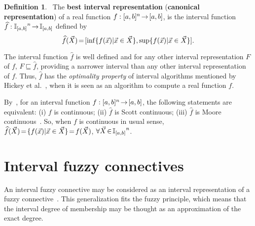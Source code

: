 \documentclass[12pt]{article}
\theoremstyle{plain}
\theoremstyle{remark}
\theoremstyle{definition}
\newtheorem{definition}[theorem]{Definition}
\theoremstyle{proposition}
\newcommand{\lra}{\hspace{-0.05cm}\rightarrow\hspace{-0.05cm}}
\begin{document}
\begin{definition}~\cite[Section 2]{SBA06}\label{d2}  The {\bf best interval representation} ({\bf canonical representation}) of a real function $f:[a,b]^n\lra [a,b]$, is the interval function
$\widehat{f}:{\mathbb{I}_{[a,b]}}^n\lra \mathbb{I}_{[a,b]}$ defined by\vspace{-0.2cm}
\begin{equation}\label{eq-br}\vspace{-0.1cm}
\widehat{f}(\vec{X})\hspace{-0.05cm}=\hspace{-0.05cm}[\inf \{f(\vec{x})|\vec{x} \in \vec{X}\}, \sup \{f(\vec{x})|\vec{x} \in \vec{X}\}].
\end{equation}
\end{definition}

The interval function $\widehat{f}$ is well defined and for any other interval representation $F$ of $f$, $F\sqsubseteq
\widehat{f}$, providing a narrower interval than any other interval representation of
$f$. Thus, $\widehat{f}$ has the \emph{optimality property} of interval algorithms mentioned by Hickey et
al.~\cite{Hic01}, when it is seen as an algorithm to compute a real function $f$.

By~\cite[Sect.~2.2]{SBA06}, for an interval function $f:[a,b]^n \lra [a,b]$, the following statements are equivalent: (i) $f$ is continuous; (ii) $\widehat{f}$ is Scott continuous; (iii)
$\widehat{f}$ is Moore continuous~\cite{SBA06}. So, when $f$ is continuous in usual sense,
$\widehat{f}(\vec{X})\hspace{-0.05cm}=\hspace{-0.05cm}\{f(\vec{x})|\vec{x}\in
\vec{X}\}\hspace{-0.05cm}=\hspace{-0.05cm}f(\vec{X})$, $\forall \vec{X}\hspace{-0.05cm}\in\hspace{-0.05cm}{\mathbb{I}_{[a,b]}}^n$.



\section{Interval fuzzy connectives}\label{sec-4}

 An interval fuzzy connective may be considered as an interval representation of a fuzzy connective~\cite{BT06b}. This generalization fits the fuzzy principle, which means that the interval degree of membership may be thought as an approximation of the exact degree.
\end{document}
